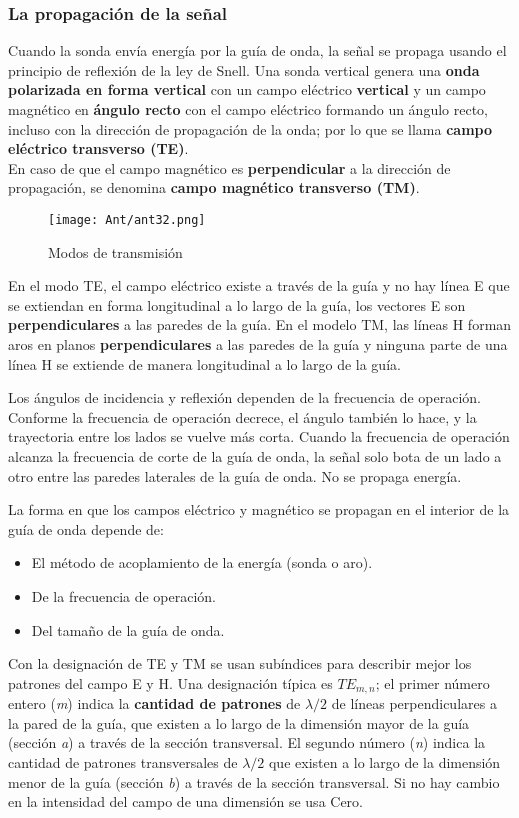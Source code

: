\documentclass[
	12pt, %
	fleqn, %
	a4paper, %
	oneside, %
]{LegrandOrangeBook}
\begin{document}
\subsubsection{La propagación de la señal}
Cuando la sonda envía energía por la guía de onda, la señal se propaga usando el principio de reflexión de la ley de Snell. Una sonda vertical genera una \textbf{onda polarizada en forma vertical} con un campo eléctrico \textbf{vertical} y un campo magnético en \textbf{ángulo recto} con el campo eléctrico formando un ángulo recto, incluso con la dirección de propagación de la onda; por lo que se llama \textbf{campo eléctrico transverso (TE)}.\\
En caso de que el campo magnético es \textbf{perpendicular} a la dirección de propagación, se denomina \textbf{campo magnético transverso (TM)}.
\begin{figure}[H]
\centering
\texttt{[image: Ant/ant32.png]}
\caption{Modos de transmisión}
\end{figure}
En el modo TE, el campo eléctrico existe a través de la guía y no hay línea E que se extiendan en forma longitudinal a lo largo de la guía, los vectores E son \textbf{perpendiculares} a las paredes de la guía.
En el modelo TM, las líneas H forman aros en planos \textbf{perpendiculares} a las paredes de la guía y ninguna parte de una línea H se extiende de manera longitudinal a lo largo de la guía.
\begin{notation}
Los ángulos de incidencia y reflexión dependen de la frecuencia de operación. Conforme la frecuencia de operación decrece, el ángulo también lo hace, y la trayectoria entre los lados se vuelve más corta.
Cuando la frecuencia de operación alcanza la frecuencia de corte de la guía de onda, la señal solo bota de un lado a otro entre las paredes laterales de la guía de onda. No se propaga energía.
\end{notation}
La forma en que los campos eléctrico y magnético se propagan en el interior de la guía de onda depende de: 
\begin{itemize}
\item El método de acoplamiento de la energía  (sonda o aro).
\item De la frecuencia de operación.
\item Del tamaño de la guía de onda.
\end{itemize}
Con la designación de TE y TM se usan subíndices para describir mejor los patrones del campo E y H. Una designación típica es $TE_{m,n}$; el primer número entero (\textit{m}) indica la \textbf{cantidad de patrones} de $\lambda/2$ de líneas perpendiculares a la pared de la guía, que existen a lo largo de la dimensión mayor de la guía (sección \textit{a}) a través de la sección transversal. El segundo número (\textit{n}) indica la cantidad de patrones transversales de $\lambda/2$ que existen a lo largo de la dimensión menor de la guía (sección \textit{b}) a través de la sección transversal. Si no hay cambio en la intensidad del campo de una dimensión se usa Cero.\\
\end{document}
